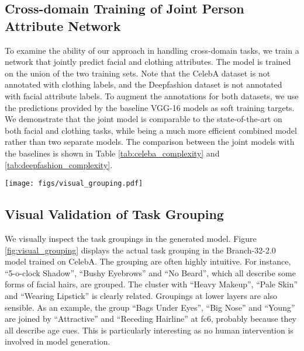 \documentclass[10pt,twocolumn,letterpaper]{article}
\begin{document}
\subsection{Cross-domain Training of Joint Person Attribute Network}
\vspace{-1mm}
To examine the ability of our approach in handling cross-domain tasks, we train a network that jointly predict facial and clothing attributes. The model is trained on the union of the two training sets. Note that the CelebA dataset is not annotated with clothing labels, and the Deepfashion dataset is not annotated with facial attribute labels. To augment the annotations for both datasets, we use the predictions provided by the baseline VGG-16 models as soft training targets. We demonstrate that the joint model is comparable to the state-of-the-art on both facial and clothing tasks, while being a much more efficient combined model rather than two separate models. The comparison between the joint models with the baselines is shown in Table \ref{tab:celeba_complexity} and \ref{tab:deepfashion_complexity}.

\begin{figure*}[t]
	\begin{center}
		\texttt{[image: figs/visual\_grouping.pdf]}  
	\end{center}
	\caption{The actual task grouping in the Branch-32-2.0 model on CelebA. Upper: fc7 layer. Lower: fc6 layer. Other layers are omitted.}
	\label{fig:visual_grouping}
\end{figure*}

\vspace{-1mm}
\subsection{Visual Validation of Task Grouping}
We visually inspect the task groupings in the generated model. Figure \ref{fig:visual_grouping} displays the actual task grouping in the Branch-32-2.0 model trained on CelebA. The grouping are often highly intuitive. For instance, ``5-o-clock Shadow'', ``Bushy Eyebrows'' and ``No Beard'', which all describe some forms of facial hairs, are grouped. The cluster with ``Heavy Makeup'', ``Pale Skin'' and ``Wearing Lipstick'' is clearly related. Groupings at lower layers are also sensible. As an example, the group ``Bags Under Eyes'', ``Big Nose'' and ``Young'' are joined by ``Attractive'' and ``Receding Hairline'' at fc6, probably because they all describe age cues. This is particularly interesting as no human intervention is involved in model generation. 
\end{document}
